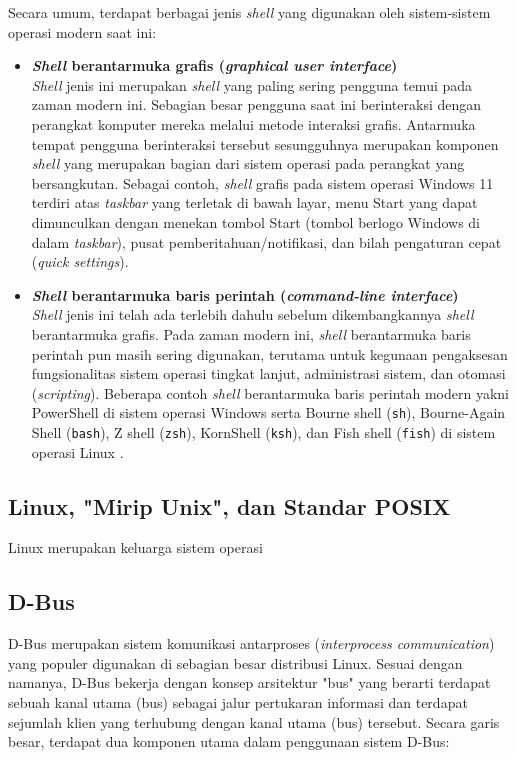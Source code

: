 Secara umum, terdapat berbagai jenis \textit{shell} yang digunakan oleh sistem-sistem operasi modern saat ini:
\begin{itemize}
    \item \textbf{\textit{Shell} berantarmuka grafis (\textit{graphical user interface})}\\
    \textit{Shell} jenis ini merupakan \textit{shell} yang paling sering pengguna temui pada zaman modern ini. Sebagian besar pengguna saat ini berinteraksi dengan perangkat komputer mereka melalui metode interaksi grafis. Antarmuka tempat pengguna berinteraksi tersebut sesungguhnya merupakan komponen \textit{shell} yang merupakan bagian dari sistem operasi pada perangkat yang bersangkutan. Sebagai contoh, \textit{shell} grafis pada sistem operasi Windows 11 terdiri atas \textit{taskbar} yang terletak di bawah layar, menu Start yang dapat dimunculkan dengan menekan tombol Start (tombol berlogo Windows di dalam \textit{taskbar}), pusat pemberitahuan/notifikasi, dan bilah pengaturan cepat (\textit{quick settings}).
    
    \item \textbf{\textit{Shell} berantarmuka baris perintah (\textit{command-line interface})}\\
    \textit{Shell} jenis ini telah ada terlebih dahulu sebelum dikembangkannya \textit{shell} berantarmuka grafis. Pada zaman modern ini, \textit{shell} berantarmuka baris perintah pun masih sering digunakan, terutama untuk kegunaan pengaksesan fungsionalitas sistem operasi tingkat lanjut, administrasi sistem, dan otomasi (\textit{scripting}). Beberapa contoh \textit{shell} berantarmuka baris perintah modern yakni PowerShell di sistem operasi Windows serta Bourne shell (\verb|sh|), Bourne-Again Shell (\verb|bash|), Z shell (\verb|zsh|), KornShell (\verb|ksh|), dan Fish shell (\verb|fish|) di sistem operasi Linux \cite{kidwai2021comparative}.
\end{itemize}

\subsection{Linux, "Mirip Unix", dan Standar POSIX}

Linux merupakan keluarga sistem operasi

\subsection{D-Bus}

D-Bus merupakan sistem komunikasi antarproses (\textit{interprocess communication}) yang populer digunakan di sebagian besar distribusi Linux. Sesuai dengan namanya, D-Bus bekerja dengan konsep arsitektur "bus" yang berarti terdapat sebuah kanal utama (bus) sebagai jalur pertukaran informasi dan terdapat sejumlah klien yang terhubung dengan kanal utama (bus) tersebut. Secara garis besar, terdapat dua komponen utama dalam penggunaan sistem D-Bus:

